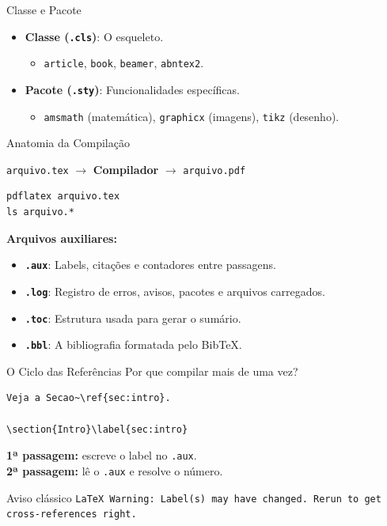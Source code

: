 \documentclass[handout]{beamer}
\begin{document}
\begin{frame}{Classe e Pacote}
    \begin{itemize}
        \item \textbf{Classe (\texttt{.cls})}: O esqueleto.
              \begin{itemize}
                  \item \texttt{article}, \texttt{book}, \texttt{beamer}, \texttt{abntex2}.
              \end{itemize}
        \item \textbf{Pacote (\texttt{.sty})}: Funcionalidades específicas.
              \begin{itemize}
                  \item \texttt{amsmath} (matemática), \texttt{graphicx} (imagens), \texttt{tikz} (desenho).
              \end{itemize}
    \end{itemize}
\end{frame}

\begin{frame}[fragile]{Anatomia da Compilação}
    \begin{center}
        \texttt{arquivo.tex} $\to$ \textbf{Compilador} $\to$ \texttt{arquivo.pdf}
    \end{center}
\begin{lstlisting}
pdflatex arquivo.tex
ls arquivo.*
\end{lstlisting}
    \textbf{Arquivos auxiliares:}
    \begin{itemize}
        \item \textbf{\texttt{.aux}}: Labels, citações e contadores entre passagens.
        \item \textbf{\texttt{.log}}: Registro de erros, avisos, pacotes e arquivos carregados.
        \item \textbf{\texttt{.toc}}: Estrutura usada para gerar o sumário.
        \item \textbf{\texttt{.bbl}}: A bibliografia formatada pelo BibTeX.
    \end{itemize}
\end{frame}

\begin{frame}[fragile]{O Ciclo das Referências}
    Por que compilar mais de uma vez?
\begin{lstlisting}[language={[latex]TeX}]
Veja a Secao~\ref{sec:intro}.

\section{Intro}\label{sec:intro}
\end{lstlisting}
    \textbf{1ª passagem:} escreve o label no \texttt{.aux}.\\
    \textbf{2ª passagem:} lê o \texttt{.aux} e resolve o número.
    \begin{alertblock}{Aviso clássico}
        \texttt{LaTeX Warning: Label(s) may have changed. Rerun to get cross-references right.}
    \end{alertblock}
\end{frame}
\end{document}

